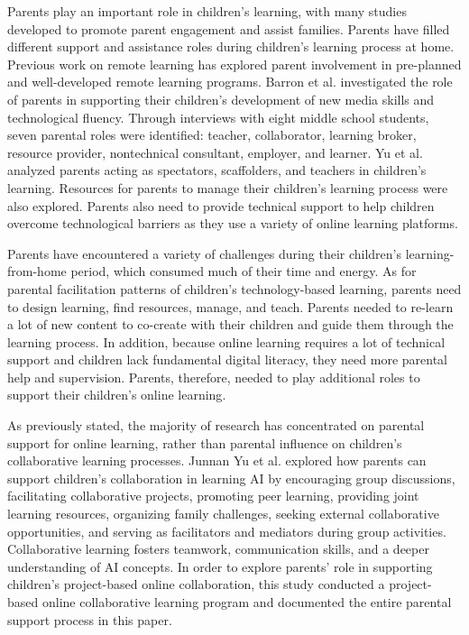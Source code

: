 Parents play an important role in children's learning, with many studies developed to promote parent engagement and assist families\citep{mendez2018guilford,cano2021early}. Parents have filled different support and assistance roles during children's learning process at home. Previous work on remote learning has explored parent involvement in pre-planned and well-developed remote learning programs\citep{gui2021teacher}. Barron et al. investigated the role of parents in supporting their children's development of new media skills and technological fluency. Through interviews with eight middle school students, seven parental roles were identified: teacher, collaborator, learning broker, resource provider, nontechnical consultant, employer, and learner\citep{barron2009parents}. Yu et al. analyzed parents acting as spectators, scaffolders, and teachers in children's learning. Resources for parents to manage their children's learning process were also explored\citep{yu2020considering}. Parents also need to provide technical support to help children overcome technological barriers as they use a variety of online learning platforms\citep{cumbo2021exploring,anastasiades2008collaborative}.

Parents have encountered a variety of challenges during their children's learning-from-home period, which consumed much of their time and energy\citep{dong2020young}. As for parental facilitation patterns of children’s technology-based learning, parents need to design learning, find resources, manage, and teach\citep{yu2021parental}. Parents needed to re-learn a lot of new content to co-create with their children and guide them through the learning process\citep{kucirkova2015child, mills2021covid}. In addition, because online learning requires a lot of technical support and children lack fundamental digital literacy, they need more parental help and supervision. Parents, therefore, needed to play additional roles to support their children's online learning\citep{han2022factors,gelir2021children}.

As previously stated, the majority of research has concentrated on parental support for online learning, rather than parental influence on children's collaborative learning processes. Junnan Yu et al. explored how parents can support children's collaboration in learning AI by encouraging group discussions, facilitating collaborative projects, promoting peer learning, providing joint learning resources, organizing family challenges, seeking external collaborative opportunities, and serving as facilitators and mediators during group activities. Collaborative learning fosters teamwork, communication skills, and a deeper understanding of AI concepts\citep{druga2022family}. In order to explore parents' role in supporting children's project-based online collaboration, this study conducted a project-based online collaborative learning program and documented the entire parental support process in this paper.

